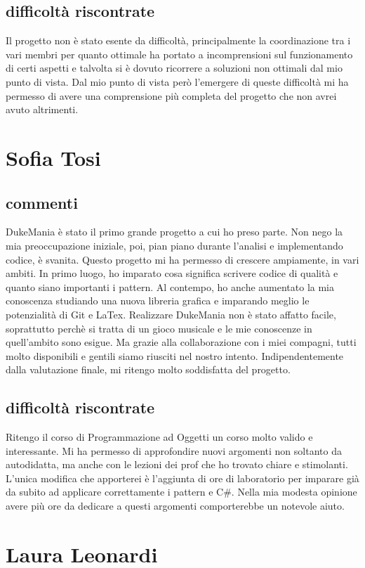 \documentclass[a4paper,12pt]{report}
\begin{document}
\subsection{difficoltà riscontrate}
Il progetto non è stato esente da difficoltà, principalmente la coordinazione tra i vari membri per quanto ottimale ha portato a incomprensioni sul funzionamento di certi aspetti e talvolta si è dovuto ricorrere a soluzioni non ottimali dal mio punto di vista. Dal mio punto di vista però l'emergere di queste difficoltà mi ha permesso di avere una comprensione più completa del progetto che non avrei avuto altrimenti.
\newpage
\section{Sofia Tosi}
\subsection{commenti}
DukeMania è stato il primo grande progetto a cui ho preso parte. 
Non nego la mia preoccupazione iniziale, poi, pian piano durante l'analisi e implementando codice, è svanita.
Questo progetto mi ha permesso di crescere ampiamente, in vari ambiti.
In primo luogo, ho imparato cosa significa scrivere codice di qualità e quanto siano importanti i pattern.
Al contempo, ho anche aumentato la mia conoscenza studiando una nuova libreria grafica e imparando meglio le potenzialità di Git e LaTex. 
Realizzare DukeMania non è stato affatto facile, soprattutto perchè si tratta di un gioco musicale e le mie conoscenze in quell'ambito
sono esigue. Ma grazie alla collaborazione con i miei compagni, tutti molto disponibili e gentili siamo riusciti nel nostro intento.
Indipendentemente dalla valutazione finale, mi ritengo molto soddisfatta del progetto.
\subsection{difficoltà riscontrate}
Ritengo il corso di Programmazione ad Oggetti un corso molto valido e interessante. 
Mi ha permesso di approfondire nuovi argomenti non soltanto da autodidatta, ma anche con le lezioni dei prof 
che ho trovato chiare e stimolanti. L'unica modifica che apporterei è l'aggiunta di ore di laboratorio per
imparare già da subito ad applicare correttamente i pattern e C\#. Nella mia modesta opinione avere più ore da dedicare a questi argomenti
comporterebbe un notevole aiuto.
\newpage
\section{Laura Leonardi}
\end{document}
